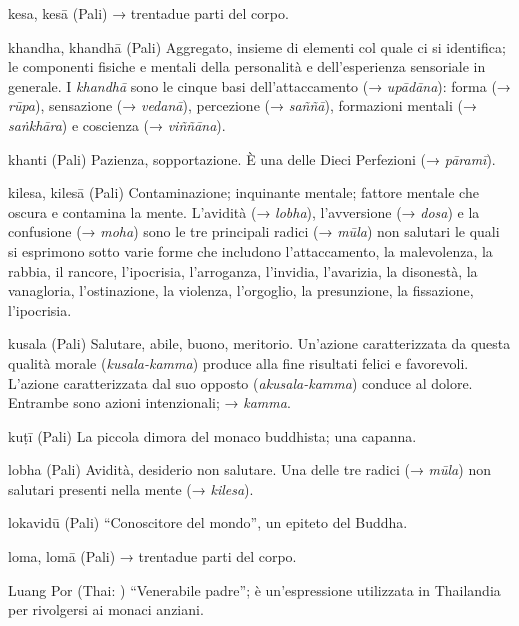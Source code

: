 \begin{glossarydescription}
\item[kesa, kesā] (Pali) → trentadue parti del corpo.

\item[khandha, khandhā] (Pali) Aggregato, insieme di elementi col
quale ci si identifica; le componenti fisiche e mentali della
personalità e dell'esperienza sensoriale in generale. I \emph{khandhā}
sono le cinque basi dell'attaccamento (→ \emph{upādāna}): forma (→
\emph{rūpa}), sensazione (→ \emph{vedanā}), percezione (→ \emph{saññā}),
formazioni mentali (→ \emph{saṅkhāra}) e coscienza (→ \emph{viññāna}).

\item[khanti] (Pali) Pazienza, sopportazione. È una delle Dieci Perfezioni (→
\emph{pāramī}).

\item[kilesa, kilesā] (Pali) Contaminazione; inquinante mentale;
fattore mentale che oscura e contamina la mente. L'avidità (→
\emph{lobha}), l'avversione (→ \emph{dosa}) e la confusione (→
\emph{moha}) sono le tre principali radici (→ \emph{mūla}) non salutari
le quali si esprimono sotto varie forme che includono l'attaccamento, la
malevolenza, la rabbia, il rancore, l'ipocrisia, l'arroganza, l'invidia,
l'avarizia, la disonestà, la vanagloria, l'ostinazione, la violenza,
l'orgoglio, la presunzione, la fissazione, l'ipocrisia.

\item[kusala] (Pali) Salutare, abile, buono, meritorio. Un'azione
caratterizzata da questa qualità morale (\emph{kusala-kamma}) produce
alla fine risultati felici e favorevoli. L'azione caratterizzata dal suo
opposto (\emph{akusala-kamma}) conduce al dolore. Entrambe sono azioni
intenzionali; → \emph{kamma}.

\item[kuṭī] (Pali) La piccola dimora del monaco buddhista; una capanna.


\item[lobha] (Pali) Avidità, desiderio non salutare. Una delle tre radici (→
\emph{mūla}) non salutari presenti nella mente (→ \emph{kilesa}).

\item[lokavidū] (Pali) ``Conoscitore del mondo'', un epiteto del Buddha.

\item[loma, lomā] (Pali) → trentadue parti del corpo.

\item[Luang Por] (Thai: ) ``Venerabile padre''; è
un'espressione utilizzata in Thailandia per rivolgersi ai monaci
anziani.


\end{glossarydescription}
